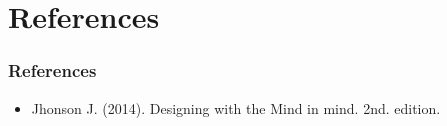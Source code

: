 \documentclass[11pt]{beamer}
\begin{document}
\section{References}
\begin{frame}
\frametitle{References}
\begin{itemize}
\item Jhonson J. (2014). Designing with the Mind in mind. 2nd. edition.
\end{itemize}
\end{frame}
\end{document}
